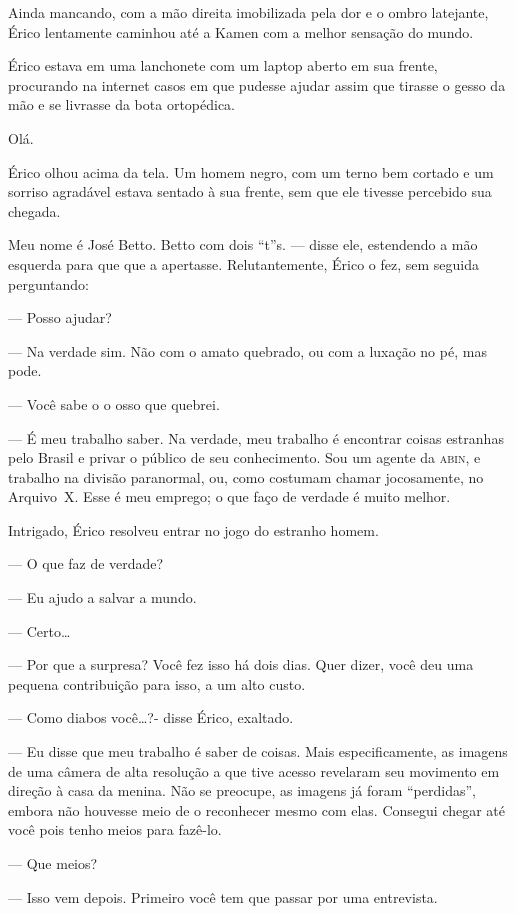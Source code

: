 Ainda mancando, com a mão direita imobilizada pela dor e o ombro latejante,
Érico lentamente caminhou até a Kamen com a melhor sensação do mundo.


Érico estava em uma lanchonete com um laptop aberto em sua frente, procurando
na internet casos em que pudesse ajudar assim que tirasse o gesso da mão e se
livrasse da bota ortopédica.

Olá.

Érico olhou acima da tela. Um homem negro, com um terno bem cortado e um
sorriso agradável estava sentado à sua frente, sem que ele tivesse percebido
sua chegada.

Meu nome é José Betto. Betto com dois “t”s. --- disse ele, estendendo a mão
esquerda para que que a apertasse. Relutantemente, Érico o fez, sem seguida
perguntando:

--- Posso ajudar?

--- Na verdade sim. Não com o amato quebrado, ou com a luxação no pé, mas pode.

--- Você sabe o o osso que quebrei.

--- É meu trabalho saber. Na verdade, meu trabalho é encontrar coisas estranhas
pelo Brasil e privar o público de seu conhecimento. Sou um agente da
\textsc{abin}, e trabalho na divisão paranormal, ou, como costumam chamar
jocosamente, no Arquivo~X. Esse é meu emprego; o que faço de verdade é muito
melhor.

Intrigado, Érico resolveu entrar no jogo do estranho homem.

--- O que faz de verdade?

--- Eu ajudo a salvar a mundo.

--- Certo\ldots

--- Por que a surpresa? Você fez isso há dois dias. Quer dizer, você deu uma
pequena contribuição para isso, a um alto custo.

--- Como diabos você\ldots?- disse Érico, exaltado.

--- Eu disse que meu trabalho é saber de coisas. Mais especificamente, as
imagens de uma câmera de alta resolução a que tive acesso revelaram seu
movimento em direção à casa da menina. Não se preocupe, as imagens já foram
“perdidas”, embora não houvesse meio de o reconhecer mesmo com elas. Consegui
chegar até você pois tenho meios para fazê-lo.

--- Que meios?

--- Isso vem depois. Primeiro você tem que passar por uma entrevista.

